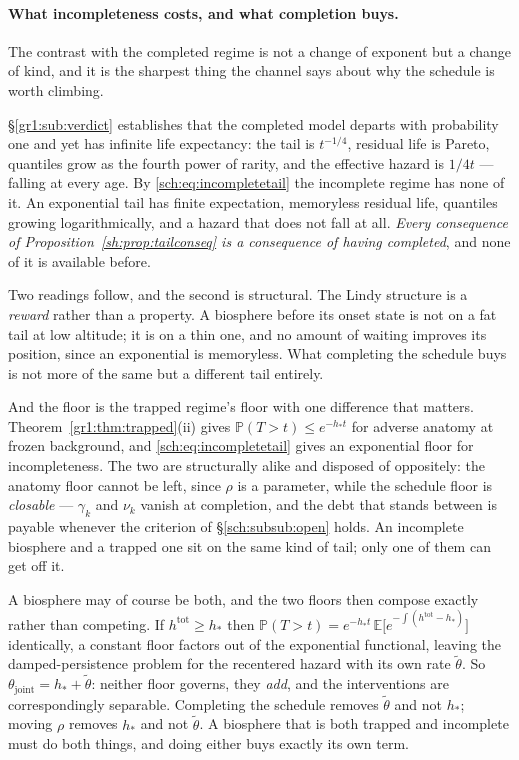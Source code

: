 \documentclass[11pt]{article}
\numberwithin{equation}{section}
\theoremstyle{plain}
\theoremstyle{definition}
\theoremstyle{remark}
\newcommand{\E}{\mathbb{E}}
\newcommand{\PP}{\mathbb{P}}
\begin{document}
\paragraph{What incompleteness costs, and what completion buys.}\label{sch:rem:suspends}
The contrast with the completed regime is not a change of exponent but a
change of kind, and it is the sharpest thing the channel says about why
the schedule is worth climbing.

\S\ref{gr1:sub:verdict} establishes that the completed model departs with
probability one and yet has infinite life expectancy: the tail is
$t^{-1/4}$, residual life is Pareto, quantiles grow as the fourth power
of rarity, and the effective hazard is $1/4t$ --- falling at every age.
By \eqref{sch:eq:incompletetail} the incomplete regime has none of it.
An exponential tail has finite expectation, memoryless residual life,
quantiles growing logarithmically, and a hazard that does not fall at
all. \emph{Every consequence of Proposition~\ref{sh:prop:tailconseq} is a
consequence of having completed}, and none of it is available before.

Two readings follow, and the second is structural. The Lindy structure is a \emph{reward} rather than a property. A
biosphere before its onset state is not on a fat tail at low altitude;
it is on a thin one, and no amount of waiting improves its position,
since an exponential is memoryless. What completing the schedule buys is
not more of the same but a different tail entirely.

And the floor is the trapped regime's floor with one difference that
matters. Theorem~\ref{gr1:thm:trapped}(ii) gives $\PP(T>t)\le e^{-h_\ast t}$
for adverse anatomy at frozen background, and \eqref{sch:eq:incompletetail}
gives an
exponential floor for incompleteness. The two are structurally alike and
disposed of oppositely: the anatomy floor cannot be left, since $\rho$ is
a parameter, while the schedule floor is \emph{closable} --- $\gamma_k$
and $\nu_k$ vanish at completion, and the debt that stands between is
payable whenever the criterion of \S\ref{sch:subsub:open} holds. An
incomplete biosphere and a trapped one sit on the same kind of tail; only
one of them can get off it.

A biosphere may of course be both, and the two floors then compose
exactly rather than competing. If $h^{\mathrm{tot}}\ge h_\ast$ then
$\PP(T>t)=e^{-h_\ast t}\,\E\bigl[e^{-\int(h^{\mathrm{tot}}-h_\ast)}\bigr]$
identically, a constant floor factors out of the exponential
functional, leaving the damped-persistence problem for the recentered
hazard with its own rate $\tilde\theta$. So
$\theta_{\mathrm{joint}}=h_\ast+\tilde\theta$: neither floor governs, they
\emph{add}, and the interventions are correspondingly separable.
Completing the schedule removes $\tilde\theta$ and not $h_\ast$; moving
$\rho$ removes $h_\ast$ and not $\tilde\theta$. A biosphere that is both
trapped and incomplete must do both things, and doing either buys exactly
its own term.
\end{document}
